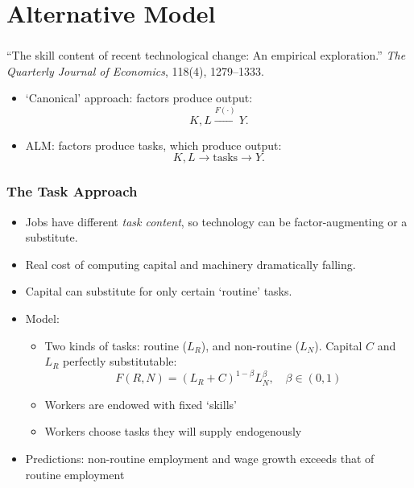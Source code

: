 \documentclass[red]{beamer}
\begin{document}
\section{Alternative Model}
\begin{frame}[fragile] %
\frametitle{\cite{Levy2003}}
``The skill content of recent technological change: An empirical exploration.'' \emph{The Quarterly Journal of Economics}, 118(4), 1279--1333.
\vspace{1cm}

\begin{itemize}
\item `Canonical' approach: factors produce output:
\[ K,L \overset{F(\cdot)}{\longrightarrow} Y. \]
\item ALM: factors produce tasks, which produce output:
\[ K, L \longrightarrow \text{tasks} \longrightarrow Y. \]
\end{itemize}
\end{frame}

\begin{frame}
\frametitle{The Task Approach}
\begin{itemize}
\item Jobs have different \emph{task content}, so technology can be factor-augmenting or a substitute.
\item Real cost of computing capital and machinery dramatically falling.
\item Capital can substitute for only certain `routine' tasks.
\item Model:
  \begin{itemize}
  \item Two kinds of tasks: routine ($L_R$), and non-routine ($L_N$). Capital $C$ and $L_R$ perfectly substitutable:
    $$ F(R,N) = (L_R + C)^{1-\beta}L_N^{\beta},\quad\beta\in(0,1)$$
  \item Workers are endowed with fixed `skills'
  \item Workers choose tasks they will supply endogenously
  \end{itemize}
\item Predictions: non-routine employment and wage growth exceeds that of routine employment
\end{itemize}
\end{frame}
\end{document}

